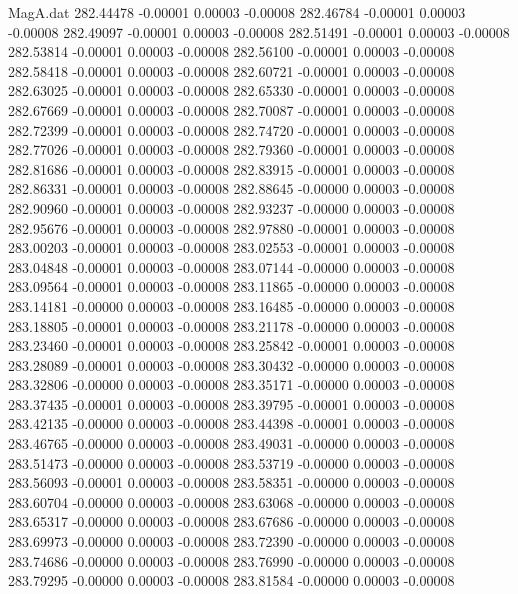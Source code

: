 \begin{filecontents}{MagA.dat}
 282.44478   -0.00001    0.00003   -0.00008
 282.46784   -0.00001    0.00003   -0.00008
 282.49097   -0.00001    0.00003   -0.00008
 282.51491   -0.00001    0.00003   -0.00008
 282.53814   -0.00001    0.00003   -0.00008
 282.56100   -0.00001    0.00003   -0.00008
 282.58418   -0.00001    0.00003   -0.00008
 282.60721   -0.00001    0.00003   -0.00008
 282.63025   -0.00001    0.00003   -0.00008
 282.65330   -0.00001    0.00003   -0.00008
 282.67669   -0.00001    0.00003   -0.00008
 282.70087   -0.00001    0.00003   -0.00008
 282.72399   -0.00001    0.00003   -0.00008
 282.74720   -0.00001    0.00003   -0.00008
 282.77026   -0.00001    0.00003   -0.00008
 282.79360   -0.00001    0.00003   -0.00008
 282.81686   -0.00001    0.00003   -0.00008
 282.83915   -0.00001    0.00003   -0.00008
 282.86331   -0.00001    0.00003   -0.00008
 282.88645   -0.00000    0.00003   -0.00008
 282.90960   -0.00001    0.00003   -0.00008
 282.93237   -0.00000    0.00003   -0.00008
 282.95676   -0.00001    0.00003   -0.00008
 282.97880   -0.00001    0.00003   -0.00008
 283.00203   -0.00001    0.00003   -0.00008
 283.02553   -0.00001    0.00003   -0.00008
 283.04848   -0.00001    0.00003   -0.00008
 283.07144   -0.00000    0.00003   -0.00008
 283.09564   -0.00001    0.00003   -0.00008
 283.11865   -0.00000    0.00003   -0.00008
 283.14181   -0.00000    0.00003   -0.00008
 283.16485   -0.00000    0.00003   -0.00008
 283.18805   -0.00001    0.00003   -0.00008
 283.21178   -0.00000    0.00003   -0.00008
 283.23460   -0.00001    0.00003   -0.00008
 283.25842   -0.00001    0.00003   -0.00008
 283.28089   -0.00001    0.00003   -0.00008
 283.30432   -0.00000    0.00003   -0.00008
 283.32806   -0.00000    0.00003   -0.00008
 283.35171   -0.00000    0.00003   -0.00008
 283.37435   -0.00001    0.00003   -0.00008
 283.39795   -0.00001    0.00003   -0.00008
 283.42135   -0.00000    0.00003   -0.00008
 283.44398   -0.00001    0.00003   -0.00008
 283.46765   -0.00000    0.00003   -0.00008
 283.49031   -0.00000    0.00003   -0.00008
 283.51473   -0.00000    0.00003   -0.00008
 283.53719   -0.00000    0.00003   -0.00008
 283.56093   -0.00001    0.00003   -0.00008
 283.58351   -0.00000    0.00003   -0.00008
 283.60704   -0.00000    0.00003   -0.00008
 283.63068   -0.00000    0.00003   -0.00008
 283.65317   -0.00000    0.00003   -0.00008
 283.67686   -0.00000    0.00003   -0.00008
 283.69973   -0.00000    0.00003   -0.00008
 283.72390   -0.00000    0.00003   -0.00008
 283.74686   -0.00000    0.00003   -0.00008
 283.76990   -0.00000    0.00003   -0.00008
 283.79295   -0.00000    0.00003   -0.00008
 283.81584   -0.00000    0.00003   -0.00008

\end{filecontents}
